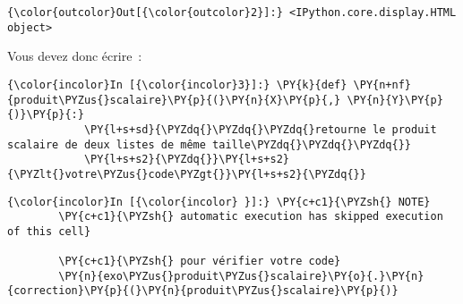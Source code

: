\begin{Verbatim}[commandchars=\\\{\}]
{\color{outcolor}Out[{\color{outcolor}2}]:} <IPython.core.display.HTML object>
\end{Verbatim}
            
    Vous devez donc écrire~:

    \begin{Verbatim}[commandchars=\\\{\}]
{\color{incolor}In [{\color{incolor}3}]:} \PY{k}{def} \PY{n+nf}{produit\PYZus{}scalaire}\PY{p}{(}\PY{n}{X}\PY{p}{,} \PY{n}{Y}\PY{p}{)}\PY{p}{:} 
            \PY{l+s+sd}{\PYZdq{}\PYZdq{}\PYZdq{}retourne le produit scalaire de deux listes de même taille\PYZdq{}\PYZdq{}\PYZdq{}}
            \PY{l+s+s2}{\PYZdq{}}\PY{l+s+s2}{\PYZlt{}votre\PYZus{}code\PYZgt{}}\PY{l+s+s2}{\PYZdq{}}
\end{Verbatim}


    \begin{Verbatim}[commandchars=\\\{\}]
{\color{incolor}In [{\color{incolor} }]:} \PY{c+c1}{\PYZsh{} NOTE}
        \PY{c+c1}{\PYZsh{} automatic execution has skipped execution of this cell}
        
        \PY{c+c1}{\PYZsh{} pour vérifier votre code}
        \PY{n}{exo\PYZus{}produit\PYZus{}scalaire}\PY{o}{.}\PY{n}{correction}\PY{p}{(}\PY{n}{produit\PYZus{}scalaire}\PY{p}{)}
\end{Verbatim}



    
    
    
